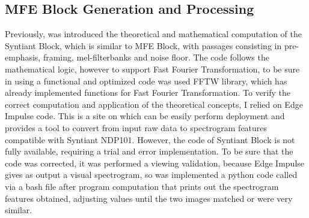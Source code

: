 \subsection{MFE Block Generation and Processing}
\label{subsec:mfe}
Previously, was introduced the theoretical and mathematical computation of the Syntiant Block, which is similar to MFE Block, with passages consisting in pre-emphasis, framing, mel-filterbanks and noise floor. The code follows the mathematical logic, however to support Fast Fourier Transformation, to be sure in using a functional and optimized code was used FFTW library, which has already implemented functions for Fast Fourier Transformation\cite{FFTW}. To verify the correct computation and application of the theoretical concepts, I relied on Edge Impulse code\cite{edgeimpulse_processing_blocks}. This is a site on which can be easily perform deployment and provides a tool to convert from input raw data to spectrogram features compatible with Syntiant NDP101. However, the code of Syntiant Block is not fully available, requiring a trial and error implementation. To be sure that the code was corrected, it was performed a viewing validation, because Edge Impulse gives as output a visual spectrogram, so was implemented a python code called via a bash file after program computation that prints out the spectrogram features obtained, adjusting values until the two images matched or were very similar.
